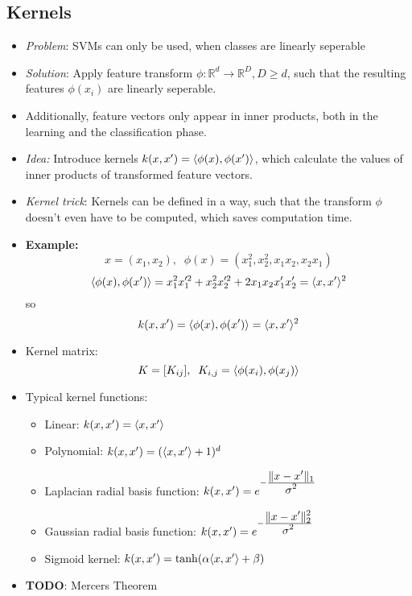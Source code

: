 \documentclass{scrartcl}
\newcommand{\ffrac}[2]{\ensuremath{\frac{\displaystyle #1}{\displaystyle #2}}}
\DeclarePairedDelimiter\norm{\lVert}{\rVert}%
\DeclarePairedDelimiter\inner{\langle}{\rangle}%
\begin{document}
\subsection{Kernels}
\begin{itemize}
    \item
        \textit{Problem}: SVMs can only be used, when classes are linearly seperable
    \item
        \textit{Solution}: Apply feature transform $\phi: \mathbb{R}^{d} \rightarrow \mathbb{R}^{D}, D \geq d$, such that the resulting features $\phi(x_i)$ are linearly seperable.
    \item
        Additionally, feature vectors only appear in inner products, both in the learning and the classification phase.
    \item
        \textit{Idea:} Introduce kernels $k(x, x') = \inner{\phi(x), \phi(x')}$, which calculate the values of inner products of transformed feature vectors.
    \item
        \textit{Kernel trick}: Kernels can be defined in a way, such that the transform $\phi$ doesn't even have to be computed, which saves computation time.
    \item
        \textbf{Example:}
        $$x = (x_1, x_2),\;\; \phi(x) = (x_1^2, x_2^2, x_1 x_2, x_2 x_1)$$
        $$\inner{\phi(x), \phi(x')} = x_1^2 x_1 '^2 + x_2^2 x_2 '^2 + 2 x_1 x_2 x_1' x_2' = \inner{x, x'}^2$$
        so
        $$ k(x, x') = \inner{\phi(x), \phi(x')} = \inner{x,x'}^2$$
    \item
        Kernel matrix:
        $$ K = [K_{ij}], \; \; K_{i,j} = \inner{\phi(x_i), \phi(x_j)}$$
    \item
        Typical kernel functions:
        \begin{itemize}
            \item
                Linear: $k(x, x') = \inner{x, x'}$
            \item
                Polynomial: $k(x, x') = (\inner{x,x'} + 1)^d$
            \item
                Laplacian radial basis function: $k(x, x') = e^{-\ffrac{\norm{x-x'}_1}{\sigma^2}}$
            \item
                Gaussian radial basis function: $k(x, x') = e^{-\ffrac{\norm{x-x'}_2^2}{\sigma^2}}$
            \item
                Sigmoid kernel: $k(x, x') = \tanh(\alpha \inner{x, x'} + \beta)$
        \end{itemize}
    \item
        \textbf{TODO}: Mercers Theorem

\end{itemize}
\end{document}
